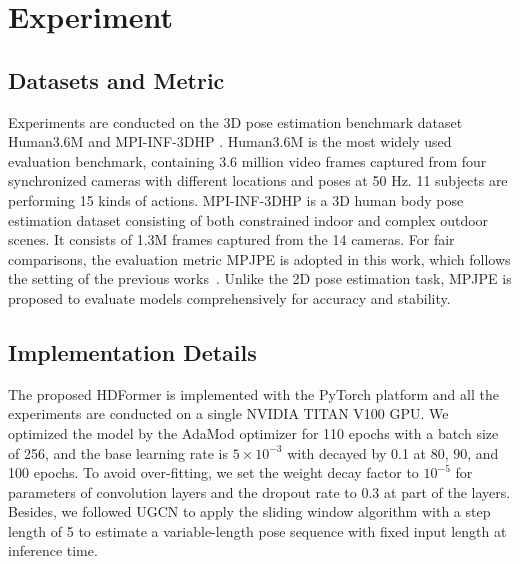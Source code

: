 \documentclass{article}
\begin{document}
\section{Experiment}
\subsection{Datasets and Metric}
Experiments are conducted on the 3D pose estimation benchmark dataset Human3.6M\cite{Ionescu_POSE_TPAMI14} and MPI-INF-3DHP \cite{Mehta_RCFSXT_3DV17}. Human3.6M is the most widely used evaluation benchmark, containing 3.6 million video frames captured from four synchronized cameras with different locations and poses at 50 Hz. 11 subjects are performing 15 kinds of actions. MPI-INF-3DHP is a 3D human body pose estimation dataset consisting of both constrained indoor and complex outdoor scenes.  It consists of 1.3M frames captured from the 14 cameras. For fair comparisons, the evaluation metric MPJPE is adopted in this work, which follows the setting of the previous works~\cite{hu(2021)-conditional,cai2019-exploiting,ZhangCVPR22MixSTE,zhao2022-graformer}. Unlike the 2D pose estimation task, MPJPE is proposed to evaluate models comprehensively for accuracy and stability.

\subsection{Implementation Details}
The proposed HDFormer is implemented with the PyTorch platform and all the experiments are conducted on a single NVIDIA TITAN V100 GPU. We optimized the model by the AdaMod optimizer \cite{ding2019adaptive} for 110 epochs with a batch size of 256, and the base learning rate is $5\times10^{-3}$ with decayed by 0.1 at 80, 90, and 100 epochs. To avoid over-fitting, we set the weight decay factor to $10^{-5}$ for parameters of convolution layers and the dropout rate to 0.3 at part of the layers. Besides, we followed UGCN \cite{wang2020-motion} to apply the sliding window algorithm with a step length of 5 to estimate a variable-length pose sequence with fixed input length at inference time.
\end{document}
